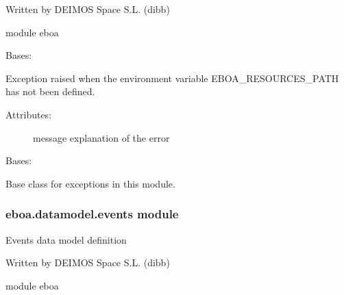 Written by DEIMOS Space S.L. (dibb)

module eboa

\begin{fulllineitems}
\label{\detokenize{eboa.datamodel:eboa.datamodel.errors.EboaResourcesPathNotAvailable}}
Bases: {\hyperref[\detokenize{eboa.datamodel:eboa.datamodel.errors.Error}]{}}

Exception raised when the environment variable EBOA\_RESOURCES\_PATH has not been defined.
\begin{description}
\item[{Attributes:}] \leavevmode
message \textendash{} explanation of the error

\end{description}

\end{fulllineitems}


\begin{fulllineitems}
\label{\detokenize{eboa.datamodel:eboa.datamodel.errors.Error}}
Bases: 

Base class for exceptions in this module.

\end{fulllineitems}



\subsubsection{eboa.datamodel.events module}
\label{\detokenize{eboa.datamodel:module-eboa.datamodel.events}}\label{\detokenize{eboa.datamodel:eboa-datamodel-events-module}}
Events data model definition

Written by DEIMOS Space S.L. (dibb)

module eboa


